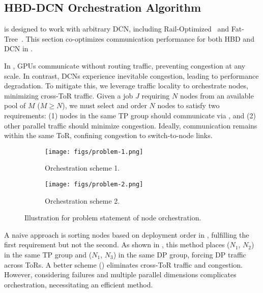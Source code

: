 



\vspace{-1ex}
\subsection{HBD-DCN Orchestration Algorithm}  
\label{sec:design:orch}  

\sys{} is designed to work with arbitrary DCN, including Rail-Optimized~\cite{rail-optimized, sigcomm2024hpn} and Fat-Tree~\cite{sigcomm2008fattree}. This section co-optimizes communication performance for both HBD and DCN in \sys{}.  


 In \sys{}, GPUs communicate without routing traffic, preventing congestion at any scale. In contrast, DCNs experience inevitable congestion, leading to performance degradation. To mitigate this, we leverage traffic locality to orchestrate nodes, minimizing cross-ToR traffic. Given a job $J$ requiring $N$ nodes from an available pool of $M$ ($M \geq N$), we must select and order $N$ nodes to satisfy two requirements: (1) nodes in the same TP group should communicate via \sys{}, and (2) other parallel traffic should minimize congestion. Ideally, communication remains within the same ToR, confining congestion to switch-to-node links.  

\begin{figure}[h!t]
\centering
\begin{subfigure}[b]{0.23\textwidth}
    \centering
    \texttt{[image: figs/problem-1.png]}
    \caption{Orchestration scheme 1.}
    \label{figure:orchstration:problem-1}
\end{subfigure}
\hspace{2pt}
\begin{subfigure}[b]{0.23\textwidth}
    \centering
    \texttt{[image: figs/problem-2.png]}
    \caption{Orchestration scheme 2.}
    \label{figure:orchstration:problem-2}
\end{subfigure}
\vspace{-6ex}
\caption{Illustration for problem statement of node orchestration.}
\vspace{-1em}
\end{figure}

A naive approach is sorting nodes based on deployment order in \sys{}, fulfilling the first requirement but not the second. As shown in , this method places ($N_1$, $N_2$) in the same TP group and ($N_1$, $N_3$) in the same DP group, forcing DP traffic across ToRs. A better scheme () eliminates cross-ToR traffic and congestion. However, considering failures and multiple parallel dimensions complicates orchestration, necessitating an efficient method.  



